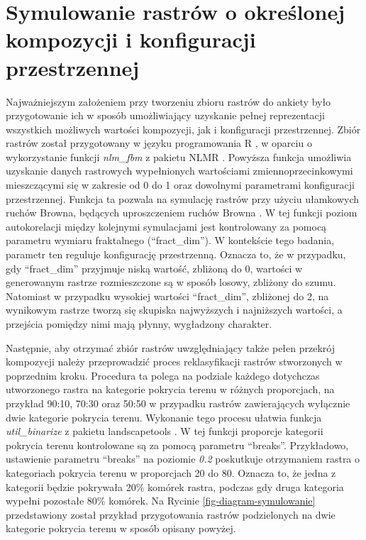 \documentclass{amuthesis}
\begin{document}
\hypertarget{sec-symulowanie}{%
\section{Symulowanie rastrów o określonej kompozycji i konfiguracji
przestrzennej}\label{sec-symulowanie}}

Najważniejszym założeniem przy tworzeniu zbioru rastrów do ankiety było
przygotowanie ich w sposób umożliwiający uzyskanie pełnej reprezentacji
wszystkich możliwych wartości kompozycji, jak i konfiguracji
przestrzennej. Zbiór rastrów został przygotowany w języku programowania
R \autocite{R2023}, w oparciu o wykorzystanie funkcji \emph{nlm\_fbm} z
pakietu NLMR \autocite{NLMR2018}. Powyższa funkcja umożliwia uzyskanie
danych rastrowych wypełnionych wartościami zmiennoprzecinkowymi
mieszczącymi się w zakresie od 0 do 1 oraz dowolnymi parametrami
konfiguracji przestrzennej. Funkcja ta pozwala na symulację rastrów przy
użyciu ułamkowych ruchów Browna, będących uproszczeniem ruchów Browna
\autocite{nlm_fbm}. W tej funkcji poziom autokorelacji między kolejnymi
symulacjami jest kontrolowany za pomocą parametru wymiaru fraktalnego
(``fract\_dim''). W kontekście tego badania, parametr ten reguluje
konfigurację przestrzenną. Oznacza to, że w przypadku, gdy
``fract\_dim'' przyjmuje niską wartość, zbliżoną do 0, wartości w
generowanym rastrze rozmieszczone są w sposób losowy, zbliżony do szumu.
Natomiast w przypadku wysokiej wartości ``fract\_dim'', zbliżonej do 2,
na wynikowym rastrze tworzą się skupiska najwyższych i najniższych
wartości, a przejścia pomiędzy nimi mają płynny, wygładzony charakter.

Następnie, aby otrzymać zbiór rastrów uwzględniający także pełen
przekrój kompozycji należy przeprowadzić proces reklasyfikacji rastrów
stworzonych w poprzednim kroku. Procedura ta polega na podziale każdego
dotychczas utworzonego rastra na kategorie pokrycia terenu w różnych
proporcjach, na przykład 90:10, 70:30 oraz 50:50 w przypadku rastrów
zawierających wyłącznie dwie kategorie pokrycia terenu. Wykonanie tego
procesu ułatwia funkcja \emph{util\_binarize} z pakietu landscapetools
\autocite{NLMR2018}. W tej funkcji proporcje kategorii pokrycia terenu
kontrolowane są za pomocą parametru ``breaks''. Przykładowo, ustawienie
parametru ``breaks'' na poziomie \emph{0.2} poskutkuje otrzymaniem
rastra o kategoriach pokrycia terenu w proporcjach 20 do 80. Oznacza to,
że jedna z kategorii będzie pokrywała 20\% komórek rastra, podczas gdy
druga kategoria wypełni pozostałe 80\% komórek. Na Rycinie
\ref{fig-diagram-symulowanie} przedstawiony został przykład
przygotowania rastrów podzielonych na dwie kategorie pokrycia terenu w
sposób opisany powyżej.
\end{document}
